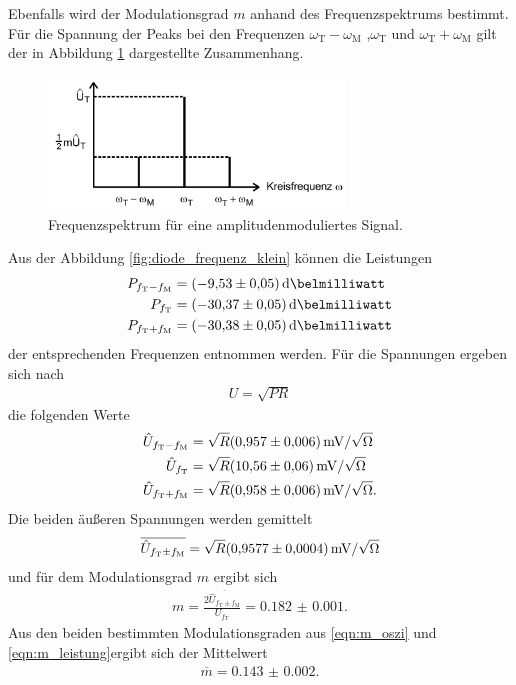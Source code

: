 Ebenfalls wird der Modulationsgrad $m$ anhand des Frequenzspektrums bestimmt.
Für die Spannung der Peaks bei den Frequenzen $\omega_{\text{T}}-\omega_{\text{M}}$ ,$\omega_{\text{T}}$  und $\omega_{\text{T}}+\omega_{\text{M}}$
gilt der in Abbildung \ref{fig:2} dargestellte
Zusammenhang.

\begin{figure}
  \centering
  \includegraphics[width=0.7\textwidth]{figures/frequenzspektrum.PNG}
  \caption{Frequenzspektrum für eine amplitudenmoduliertes Signal.}
  \label{fig:2}
\end{figure}

Aus der Abbildung \ref{fig:diode_frequenz_klein} können die Leistungen
\begin{align}
P_{f_{\text{T}}-f_{\text{M}}}&=\SI{-9.53(5)}{\deci\belmilliwatt}\\
P_{f_{\text{T}}}&=\SI{-30.37(5)}{\deci\belmilliwatt}\\
P_{f_{\text{T}}+f_{\text{M}}}&=\SI{-30.38(5)}{\deci\belmilliwatt}
\end{align}
der entsprechenden Frequenzen entnommen werden.
Für die Spannungen ergeben sich nach
\begin{align}
  U= \sqrt{P R}
\end{align}
die folgenden Werte
\begin{align}
   \hat{U}_{f_{\text{T}}-f_{\text{M}}}&=\sqrt{R}\SI{0.957(6)}{\milli\volt\per\sqrt{\ohm}}\\
  \hat{U}_{f_{\text{T}}}&=\sqrt{R}\SI{10.56(6)}{\milli\volt\per\sqrt{\ohm}}\\
  \hat{U}_{f_{\text{T}}+f_{\text{M}}}&=\sqrt{R}\SI{0.958(6)}{\milli\volt\per\sqrt{\ohm}}.
\end{align}
Die beiden äußeren Spannungen werden gemittelt
\begin{align}
  \overline{\hat{U}_{f_{\text{T}}\pm f_{\text{M}}}} = \sqrt{R}\SI{0.9577(4)}{\milli\volt\per\sqrt{\ohm}}
\end{align}
und für
dem Modulationsgrad $m$ ergibt sich
\begin{align}
m=\frac{2\overline{\hat{U}_{f_{\text{T}}\pm f_{\text{M}}}}}{U_{f_{\text{T}}}} = \num{0.182(1)}. \label{eqn:m_leistung}
\end{align}
Aus den beiden bestimmten Modulationsgraden aus \eqref{eqn:m_oszi} und \eqref{eqn:m_leistung}ergibt sich der Mittelwert
\begin{align}
\overline{m}=\num{0.143(2)}.
\end{align}

